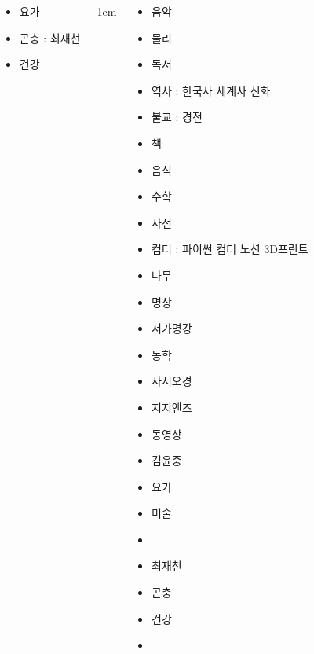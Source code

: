\documentclass[	20pt, 
							a1paper, 
							portrait, %
							margin=0mm, %
							innermargin=10mm,  		%
							colspace=5mm, 
							subcolspace=0mm
							]{tikzposter}
\begin{document}
\begin{columns}
{\begin{LARGE}
\begin{itemize}
					\item 	요가
					\item 	곤충 : 최재천
					\item 	건강

					\end{itemize}
				\end{LARGE}
			}





			{
					\setlength{\leftmargini}{4em}
					\setlength{\labelsep} {1em}
				\begin{LARGE}
					\begin{itemize}
					\item 	음악
					\item 	물리
					\item 	독서
					\item 	역사 : 한국사 세계사 신화
					\item 	불교 : 경전
					\item 	책
					\item 	음식
					\item 	수학
					\item 	사전
					\item 	컴터 : 파이썬  컴터 노션 3D프린트
					\item 	나무
					\item 	명상
					\item 	서가명강
					\item 	동학
					\item 	사서오경
					\item 	지지엔즈
					\item 	동영상
					\item 	김윤중
					\item 	요가
					\item 	미술
					\item 	
					\item 	최재천
					\item 	곤충
					\item 	건강
					\item 	


					\end{itemize}
				\end{LARGE}
			}





	\end{columns}
\end{document}
